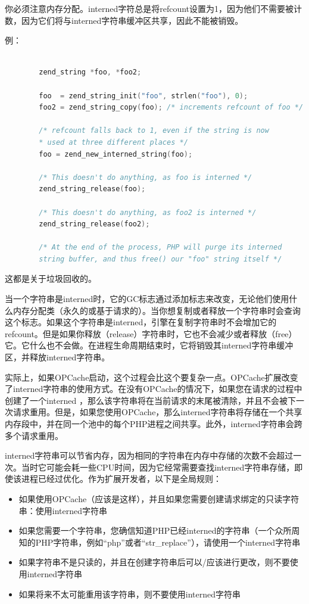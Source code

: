 你必须注意内存分配。interned字符总是将refcount设置为1，因为他们不需要被计数，因为它们将与interned字符串缓冲区共享，因此不能被销毁。

例：

\begin{lstlisting}[language=c]

        zend_string *foo, *foo2;

        foo  = zend_string_init("foo", strlen("foo"), 0);
        foo2 = zend_string_copy(foo); /* increments refcount of foo */

        /* refcount falls back to 1, even if the string is now
        * used at three different places */
        foo = zend_new_interned_string(foo);

        /* This doesn't do anything, as foo is interned */
        zend_string_release(foo);

        /* This doesn't do anything, as foo2 is interned */
        zend_string_release(foo2);

        /* At the end of the process, PHP will purge its interned
        string buffer, and thus free() our "foo" string itself */
\end{lstlisting}

这都是关于垃圾回收的。

当一个字符串是interned时，它的GC标志通过添加标志来改变，无论他们使用什么内存分配类（永久的或基于请求的）。当你想复制或者释放一个字符串时会查询这个标志。如果这个字符串是interned，引擎在复制字符串时不会增加它的refcount。但是如果你释放（release）字符串时，它也不会减少或者释放（free）它。它什么也不会做。在进程生命周期结束时，它将销毁其interned字符串缓冲区，并释放interned字符串。

实际上，如果OPCache启动，这个过程会比这个要复杂一点。OPCache扩展改变了interned字符串的使用方式。在没有OPCache的情况下，如果您在请求的过程中创建了一个interned ，那么该字符串将在当前请求的末尾被清除，并且不会被下一次请求重用。但是，如果您使用OPCache，那么interned字符串将存储在一个共享内存段中，并在同一个池中的每个PHP进程之间共享。此外，interned字符串会跨多个请求重用。

interned字符串可以节省内存，因为相同的字符串在内存中存储的次数不会超过一次。当时它可能会耗一些CPU时间，因为它经常需要查找interned字符串存储，即使该进程已经过优化。作为扩展开发者，以下是全局规则：

\begin{itemize}
        \item 如果使用OPCache（应该是这样），并且如果您需要创建请求绑定的只读字符串：使用interned字符串
        \item 如果您需要一个字符串，您确信知道PHP已经interned的字符串（一个众所周知的PHP字符串，例如“php”或者“str\_replace”），请使用一个interned字符串
        \item 如果字符串不是只读的，并且在创建字符串后可以/应该进行更改，则不要使用interned字符串
        \item 如果将来不太可能重用该字符串，则不要使用interned字符串
\end{itemize}

